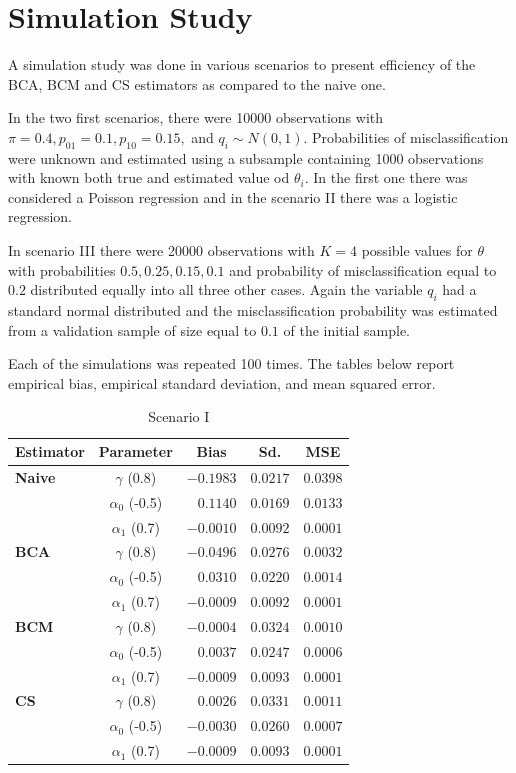 \documentclass[11pt]{article}
\theoremstyle{definition}
\theoremstyle{remark}
\begin{document}
\section{Simulation Study}
A simulation study was done in various scenarios to present efficiency of the BCA, BCM and CS estimators  as compared to the naive one.

In the two first scenarios, there were 10000 observations with $\pi = 0.4, p_{01}=0.1, p_{10} = 0.15,$ and $q_i\sim N(0, 1)$. Probabilities of misclassification were unknown and estimated using a subsample containing 1000 observations with known both true and estimated value od $\theta_i$. In the first one there was considered a Poisson regression and in the scenario II there was a logistic regression.

In scenario III there were 20000 observations with $K=4$ possible values for $\theta$ with probabilities $0.5, 0.25, 0.15, 0.1$ and probability of misclassification equal to $0.2$ distributed equally into all three other cases. Again the variable $q_i$ had a standard normal distributed and the misclassification probability was estimated from a validation sample of size equal to $0.1$ of the initial sample.

Each of the simulations was repeated 100 times. The tables below report empirical bias, empirical standard deviation, and mean squared error.
\begin{table}[ht]
\centering
\caption{Scenario I}
\begin{tabular}{l c r r r}
\hline
\hline
Estimator & Parameter & \multicolumn{1}{c}{Bias} & \multicolumn{1}{c}{Sd.} & \multicolumn{1}{c}{MSE} \\
\hline
\textbf{Naive} & $\gamma$ (0.8)   & $-0.1983$ & $0.0217$ & $0.0398$ \\
               & $\alpha_0$ (-0.5) & $0.1140$  & $0.0169$ & $0.0133$ \\
               & $\alpha_1$ (0.7)  & $-0.0010$ & $0.0092$ & $0.0001$ \\
\hline
\textbf{BCA}   & $\gamma$ (0.8)   & $-0.0496$ & $0.0276$ & $0.0032$ \\
               & $\alpha_0$ (-0.5) & $0.0310$  & $0.0220$ & $0.0014$ \\
               & $\alpha_1$ (0.7)  & $-0.0009$ & $0.0092$ & $0.0001$ \\
\hline
\textbf{BCM}   & $\gamma$ (0.8)   & $-0.0004$ & $0.0324$ & $0.0010$ \\
               & $\alpha_0$ (-0.5) & $0.0037$  & $0.0247$ & $0.0006$ \\
               & $\alpha_1$ (0.7)  & $-0.0009$ & $0.0093$ & $0.0001$ \\
\hline
\textbf{CS}    & $\gamma$ (0.8)   & $0.0026$  & $0.0331$ & $0.0011$ \\
               & $\alpha_0$ (-0.5) & $-0.0030$ & $0.0260$ & $0.0007$ \\
               & $\alpha_1$ (0.7)  & $-0.0009$ & $0.0093$ & $0.0001$ \\
\hline
\hline
\end{tabular}
\end{table}
\end{document}
